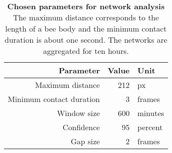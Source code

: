 \begin{table}[htbp]
\small
\centering
\caption[Chosen parameters for network analysis]{\textbf{Chosen parameters for network analysis} The maximum distance corresponds to the length of a bee body and the minimum contact duration is about one second. The networks are aggregated for ten hours.\\
}
\label{tab:chosenparams}

\begin{tabular}{rrl}
	\toprule
	\textbf{Parameter} & \textbf{Value} & \textbf{Unit} \\ \midrule
	Maximum distance & 212 & px \\
	Minimum contact duration & 3 & frames \\
	Window size & 600 & minutes \\ \midrule
	Confidence & 95 & percent \\
	Gap size & 2 & frames \\
	\bottomrule
	 
\end{tabular}

\end{table}